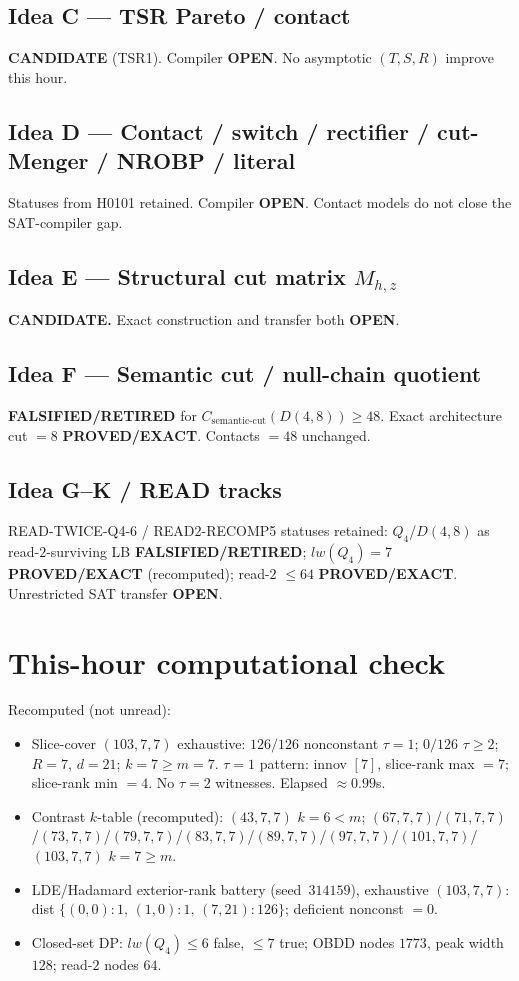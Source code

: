 \documentclass[11pt]{article}
\begin{document}
\subsection*{Idea C --- TSR Pareto / contact}
\textbf{CANDIDATE} (TSR1). Compiler \textbf{OPEN}. No asymptotic $(T,S,R)$ improve this hour.

\subsection*{Idea D --- Contact / switch / rectifier / cut-Menger / NROBP / literal}
Statuses from H0101 retained. Compiler \textbf{OPEN}. Contact models do not close the SAT-compiler gap.

\subsection*{Idea E --- Structural cut matrix $M_{h,z}$}
\textbf{CANDIDATE.} Exact construction and transfer both \textbf{OPEN}.

\subsection*{Idea F --- Semantic cut / null-chain quotient}
\textbf{FALSIFIED/RETIRED} for $C_{\mathrm{semantic\textrm{-}cut}}(D(4,8))\ge48$.
Exact architecture cut $=8$ \textbf{PROVED/EXACT}. Contacts $=48$ unchanged.

\subsection*{Idea G--K / READ tracks}
READ-TWICE-Q4-6 / READ2-RECOMP5 statuses retained: $Q_4$/$D(4,8)$ as read-$2$-surviving LB
\textbf{FALSIFIED/RETIRED}; $lw(Q_4)=7$ \textbf{PROVED/EXACT} (recomputed); read-$2$ $\le64$
\textbf{PROVED/EXACT}. Unrestricted SAT transfer \textbf{OPEN}.

\section*{This-hour computational check}
Recomputed (not unread):
\begin{itemize}
\item Slice-cover $(103,7,7)$ exhaustive: $126/126$ nonconstant $\tau{=}1$;
  $0/126$ $\tau{\ge}2$; $R{=}7$, $d{=}21$; $k{=}7{\ge}m{=}7$.
  $\tau{=}1$ pattern: innov $[7]$, slice-rank max $=7$; slice-rank min $=4$.
  No $\tau{=}2$ witnesses. Elapsed $\approx0.99$s.
\item Contrast $k$-table (recomputed): $(43,7,7)$ $k{=}6{<}m$;
  $(67,7,7)$/$(71,7,7)$/$(73,7,7)$/$(79,7,7)$/$(83,7,7)$/$(89,7,7)$/$(97,7,7)$/$(101,7,7)$/$(103,7,7)$ $k{=}7{\ge}m$.
\item LDE/Hadamard exterior-rank battery (seed~$314159$), exhaustive $(103,7,7)$:
  dist $\{(0,0){:}1,\,(1,0){:}1,\,(7,21){:}126\}$; deficient nonconst $=0$.
\item Closed-set DP: $lw(Q_4)\le6$ false, $\le7$ true; OBDD nodes $1773$, peak width $128$;
  read-$2$ nodes $64$.
\end{itemize}
\end{document}
